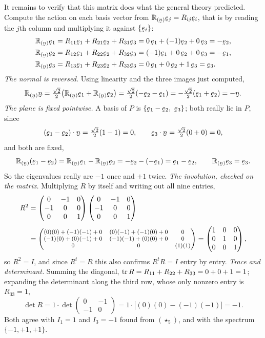 \begin{solution}
It remains to verify that this matrix does what the general theory
predicted. Compute the action on each basis vector from
$\Refl{\bn}\be_j=R_{ij}\be_i$, that is by reading the $j$th column and
multiplying it against $\{\be_i\}$:
\[
\begin{aligned}
   \Refl{\bn}\be_1&=R_{11}\be_1+R_{21}\be_2+R_{31}\be_3
    =0\,\be_1+(-1)\be_2+0\,\be_3=-\be_2,\\
   \Refl{\bn}\be_2&=R_{12}\be_1+R_{22}\be_2+R_{32}\be_3
    =(-1)\be_1+0\,\be_2+0\,\be_3=-\be_1,\\
   \Refl{\bn}\be_3&=R_{13}\be_1+R_{23}\be_2+R_{33}\be_3
    =0\,\be_1+0\,\be_2+1\,\be_3=\be_3 .
\end{aligned}
\]
\emph{The normal is reversed.} Using linearity and the three images just
computed,
\[
   \Refl{\bn}\bn=\tfrac{\sqrt2}{2}\big(\Refl{\bn}\be_1+\Refl{\bn}\be_2\big)
   =\tfrac{\sqrt2}{2}(-\be_2-\be_1)
   =-\tfrac{\sqrt2}{2}(\be_1+\be_2)=-\bn .
\]
\emph{The plane is fixed pointwise.} A basis of $P$ is
$\{\be_1-\be_2,\ \be_3\}$; both really lie in $P$, since
\[
   \ip{(\be_1-\be_2)}{\bn}=\tfrac{\sqrt2}{2}(1-1)=0,\qquad
   \ip{\be_3}{\bn}=\tfrac{\sqrt2}{2}(0+0)=0,
\]
and both are fixed,
\[
   \Refl{\bn}(\be_1-\be_2)=\Refl{\bn}\be_1-\Refl{\bn}\be_2
   =-\be_2-(-\be_1)=\be_1-\be_2,\qquad
   \Refl{\bn}\be_3=\be_3 .
\]
So the eigenvalues really are $-1$ once and $+1$ twice.
\emph{The involution, checked on the matrix.} Multiplying $R$ by itself and
writing out all nine entries,
\[
\begin{aligned}
   R^{2}&=\begin{pmatrix}0&-1&0\\-1&0&0\\0&0&1\end{pmatrix}
         \begin{pmatrix}0&-1&0\\-1&0&0\\0&0&1\end{pmatrix}\\[1mm]
   &={\footnotesize\begin{pmatrix}
     (0)(0)+(-1)(-1)+0 & (0)(-1)+(-1)(0)+0 & 0\\
     (-1)(0)+(0)(-1)+0 & (-1)(-1)+(0)(0)+0 & 0\\
     0 & 0 & (1)(1)\end{pmatrix}}
   =\begin{pmatrix}1&0&0\\0&1&0\\0&0&1\end{pmatrix},
\end{aligned}
\]
so $R^{2}=I$, and since $R^{t}=R$ this also confirms $R^{t}R=I$ entry by
entry. \emph{Trace and determinant.} Summing the diagonal,
$\operatorname{tr} R=R_{11}+R_{22}+R_{33}=0+0+1=1$; expanding the determinant along the
third row, whose only nonzero entry is $R_{33}=1$,
\[
   \det R=1\cdot\det\begin{pmatrix}0&-1\\-1&0\end{pmatrix}
   =1\cdot\big[(0)(0)-(-1)(-1)\big]=-1 .
\]
Both agree with $I_1=1$ and $I_3=-1$ found from $(\star_5)$, and with the
spectrum $\{-1,+1,+1\}$.
\end{solution}


